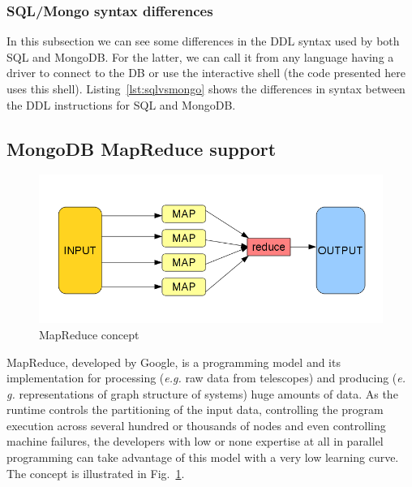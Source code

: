 

\subsubsection{SQL/Mongo syntax differences}

In this subsection we can see some differences in the DDL syntax used by both SQL and MongoDB. For the latter, we can call it from any language having a driver to connect to the DB or use the interactive shell (the code presented here uses this shell). Listing~\ref{lst:sqlvsmongo} shows the differences in syntax between the DDL instructions for SQL and MongoDB.




\subsection{MongoDB MapReduce support} %
\label{sub:mongodb_mapreduce_support}

\begin{figure}[tb]
\centering
\includegraphics[width=\textwidth]{images/map_reduce_chart.png}
\caption{MapReduce concept}
\label{fig:mapreduce}
\end{figure}

MapReduce, developed by Google, is a programming model and its implementation for processing (\textit{e.g.} raw data from telescopes) and producing (\textit{e. g.} representations of graph structure of systems) huge amounts of data. As the runtime controls the partitioning of the input data, controlling the program execution across several hundred or thousands of nodes and even controlling machine failures, the developers with low or none expertise at all in parallel programming can take advantage of this model with a very low learning curve.
The concept is illustrated in Fig.~\ref{fig:mapreduce}.

